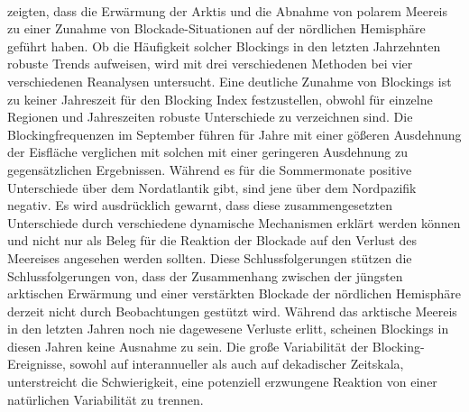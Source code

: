 \citet{barnes-2014}\\
\citet{liu-2012} \citet{francis-2012} \citet{tang-2013} zeigten, dass die Erwärmung der Arktis und die Abnahme von polarem Meereis zu einer Zunahme von Blockade-Situationen auf der nördlichen Hemisphäre geführt haben. Ob die Häufigkeit solcher Blockings in den letzten Jahrzehnten robuste Trends aufweisen, wird mit drei verschiedenen Methoden bei vier verschiedenen Reanalysen untersucht. Eine deutliche Zunahme von Blockings ist zu keiner Jahreszeit für den Blocking Index festzustellen, obwohl für einzelne Regionen und Jahreszeiten robuste Unterschiede zu verzeichnen sind. Die Blockingfrequenzen im September führen für Jahre mit einer gößeren Ausdehnung der Eisfläche verglichen mit solchen mit einer geringeren Ausdehnung zu gegensätzlichen Ergebnissen. Während es für die Sommermonate positive Unterschiede über dem Nordatlantik gibt, sind jene über dem Nordpazifik negativ. Es wird ausdrücklich  gewarnt, dass diese zusammengesetzten Unterschiede durch verschiedene dynamische Mechanismen erklärt werden können und nicht nur als Beleg für die Reaktion der Blockade auf den Verlust des Meereises angesehen werden sollten. Diese Schlussfolgerungen stützen die Schlussfolgerungen von\citet{barnes-2013}, dass der Zusammenhang zwischen der jüngsten arktischen Erwärmung und einer verstärkten Blockade der nördlichen Hemisphäre derzeit nicht durch Beobachtungen gestützt wird. Während das arktische Meereis in den letzten Jahren noch nie dagewesene Verluste erlitt, scheinen Blockings in diesen Jahren keine Ausnahme zu sein. Die große Variabilität der Blocking-Ereignisse, sowohl auf interannueller als auch auf dekadischer Zeitskala, unterstreicht die Schwierigkeit, eine potenziell erzwungene Reaktion von einer natürlichen Variabilität zu trennen.

